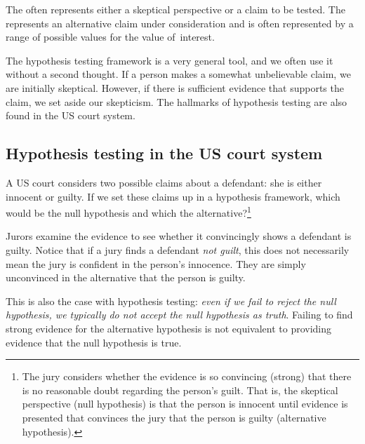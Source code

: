 \begin{termBox}{
The  often represents either a skeptical perspective or a claim to be tested. The  represents an alternative claim under consideration and is often represented by a range of possible values for the value of~interest.}
\end{termBox}

The hypothesis testing framework is a very general tool, and we often use it without a second thought. If a person makes a somewhat unbelievable claim, we are initially skeptical. However, if there is sufficient evidence that supports the claim, we set aside our skepticism. The hallmarks of hypothesis testing are also found in the US court system. 

\subsection{Hypothesis testing in the US court system}

\begin{exercise} \label{hypTestCourtExample}
A US court considers two possible claims about a defendant: she is either innocent or guilty. If we set these claims up in a hypothesis framework, which would be the null hypothesis and which the alternative?\footnote{The jury considers whether the evidence is so convincing (strong) that there is no reasonable doubt regarding the person's guilt. That is, the skeptical perspective (null hypothesis) is that the person is innocent until evidence is presented that convinces the jury that the person is guilty (alternative hypothesis).}
\end{exercise}

Jurors examine the evidence to see whether it convincingly shows a defendant is guilty. Notice that if a jury finds a defendant \emph{not guilt}, this does not necessarily mean the jury is confident in the person's innocence. They are simply unconvinced in the alternative that the person is guilty.

This is also the case with hypothesis testing: \emph{even if we fail to reject the null hypothesis, we typically do not accept the null hypothesis as truth}. Failing to find strong evidence for the alternative hypothesis is not equivalent to providing evidence that the null hypothesis is true.


